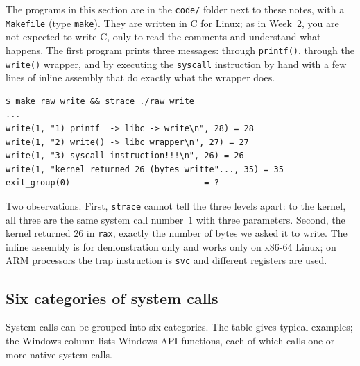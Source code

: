 \documentclass[11pt,a4paper]{article}
\newcommand{\cmd}[1]{\texttt{#1}}
\begin{document}
The programs in this section are in the \texttt{code/} folder next to these notes, with a \texttt{Makefile} (type \cmd{make}). They are written in C for Linux; as in Week~2, you are not expected to write C, only to read the comments and understand what happens. The first program prints three messages: through \cmd{printf()}, through the \cmd{write()} wrapper, and by executing the \texttt{syscall} instruction by hand with a few lines of inline assembly that do exactly what the wrapper does.



\begin{lstlisting}[style=term]
$ make raw_write && strace ./raw_write
...
write(1, "1) printf  -> libc -> write\n", 28) = 28
write(1, "2) write() -> libc wrapper\n", 27) = 27
write(1, "3) syscall instruction!!!\n", 26) = 26
write(1, "kernel returned 26 (bytes writte"..., 35) = 35
exit_group(0)                           = ?
\end{lstlisting}

Two observations. First, \cmd{strace} cannot tell the three levels apart: to the kernel, all three are the same system call number~$1$ with three parameters. Second, the kernel returned $26$ in \texttt{rax}, exactly the number of bytes we asked it to write. The inline assembly is for demonstration only and works only on x86-64 Linux; on ARM processors the trap instruction is \texttt{svc} and different registers are used.

\subsection{Six categories of system calls}

System calls can be grouped into six categories. The table gives typical examples; the Windows column lists Windows API functions, each of which calls one or more native system calls.
\end{document}
